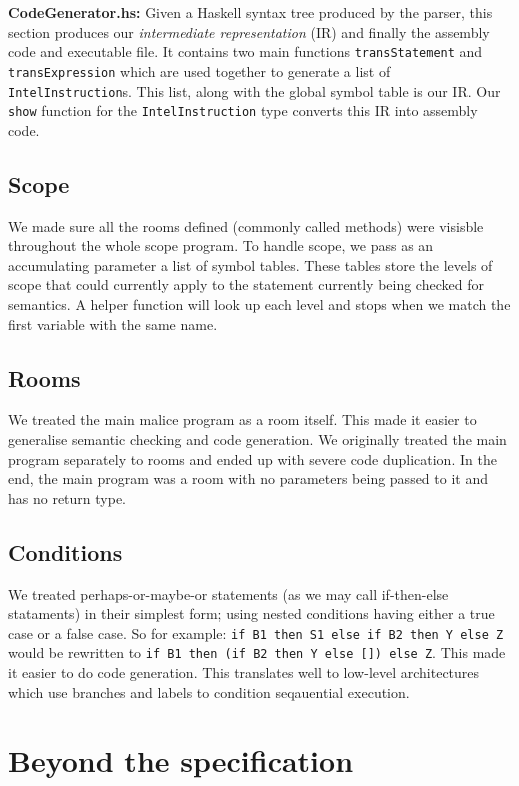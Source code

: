 \documentclass[a4wide, 10pt]{article}
\begin{document}
\textbf{CodeGenerator.hs:} Given a Haskell syntax tree produced by the
parser, this section produces our \textit{intermediate representation} (IR)
and finally the assembly code and executable file. It contains two main
functions \texttt{transStatement} and \texttt{transExpression} which are
used together to generate a list of \texttt{IntelInstruction}s. This list,
along with the global symbol table is our IR. Our \texttt{show} function for
the \texttt{IntelInstruction} type converts this IR into assembly code.

\subsection{Scope} We made sure all the rooms defined (commonly called methods) were visisble
throughout the whole scope program. To handle scope, we pass as an accumulating parameter 
a list of symbol tables. These tables store the levels of scope that could currently apply to
the statement currently being checked for semantics. A helper function will look up each level
and stops when we match the first variable with the same name. 

\subsection{Rooms} We treated the main malice program as a room itself. This made it easier to
generalise semantic checking and code generation. We originally treated the main program separately
to rooms and ended up with severe code duplication. In the end, the main program was a room
with no parameters being passed to it and has no return type.

\subsection{Conditions} We treated perhaps-or-maybe-or statements (as we may call if-then-else stataments)
in their simplest form; using nested conditions having either a true case or a false case.
So for example: \texttt{if B1 then S1 else if B2 then Y else Z} would be rewritten to
\texttt{if B1 then (if B2 then Y else []) else Z}. This made it easier to do code generation.
This translates well to low-level architectures which use branches and labels to condition seqauential
execution.




{\newpage}

\section{Beyond the specification}
\end{document}
